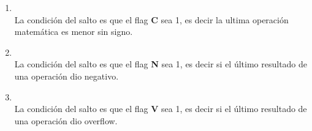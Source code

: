 \begin{enumerate}
\item  {}\\
La condición del salto es que el flag \textbf{C} sea 1, es decir la ultima operación matemática es menor sin signo.

\item  {}\\
La condición del salto es que el flag \textbf{N} sea 1, es decir si el último resultado de una operación dio negativo.

\item  {}\\
La condición del salto es que el flag \textbf{V} sea 1, es decir si el último resultado de una operación dio overflow.

\end{enumerate}